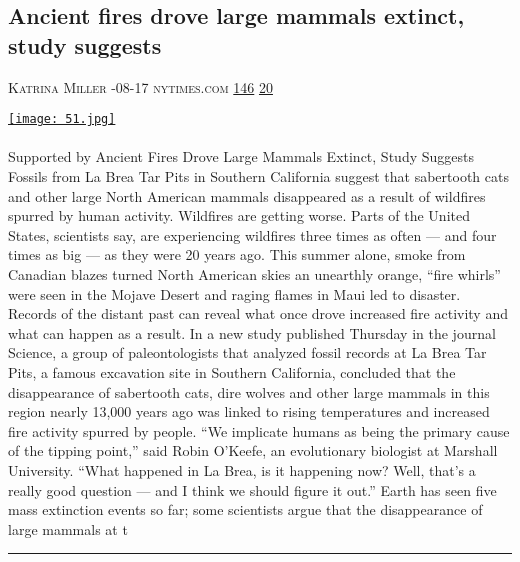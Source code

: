 \documentclass[10pt,a4paper]{article}
\begin{document}
\begin{multicols}{2}
\begin{minipage}{\linewidth}
\subsection{Ancient fires drove large mammals extinct, study suggests}
\textsc{\footnotesize
{\scriptsize\faUser}\space 
Katrina Miller 
{\scriptsize\faCalendar}-08-17 
{\scriptsize\faGlobe}\space 
nytimes.com 
{\scriptsize\faThumbsOUp}\space 
\href{http://news.ycombinator.com/item?id=37166986\&utm\_term=comment}{146} 
{\scriptsize\faComments}\space 
\href{http://news.ycombinator.com/item?id=37166986\&utm\_term=comment}{20} 
}
\par\medskip\noindent
\href{https://www.nytimes.com/2023/08/17/science/climate-paleontology-mammals.html?utm\_source=hackernewsletter\&utm\_medium=email\&utm\_term=learn}{
    \texttt{[image: 51.jpg]}
}
\end{minipage}
\paragraph{}
Supported by
Ancient Fires Drove Large Mammals Extinct, Study Suggests
Fossils from La Brea Tar Pits in Southern California suggest that sabertooth cats and other large North American mammals disappeared as a result of wildfires spurred by human activity.
Wildfires are getting worse. Parts of the United States, scientists say, are experiencing wildfires three times as often — and four times as big — as they were 20 years ago. This summer alone, smoke from Canadian blazes turned North American skies an unearthly orange, “fire whirls” were seen in the Mojave Desert and raging flames in Maui led to disaster.
Records of the distant past can reveal what once drove increased fire activity and what can happen as a result. In a new study published Thursday in the journal Science, a group of paleontologists that analyzed fossil records at La Brea Tar Pits, a famous excavation site in Southern California, concluded that the disappearance of sabertooth cats, dire wolves and other large mammals in this region nearly 13,000 years ago was linked to rising temperatures and increased fire activity spurred by people.
“We implicate humans as being the primary cause of the tipping point,” said Robin O’Keefe, an evolutionary biologist at Marshall University. “What happened in La Brea, is it happening now? Well, that’s a really good question — and I think we should figure it out.”
Earth has seen five mass extinction events so far; some scientists argue that the disappearance of large mammals at t
\par\noindent\textcolor{red}{\rule{\linewidth}{0.2mm}}
\vfill
\null
\noindent\begin{minipage}{\linewidth}

\end{minipage}
\end{multicols}
\end{document}
